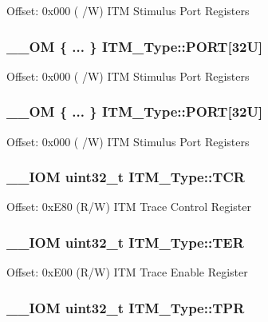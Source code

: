 Offset\-: 0x000 ( /\-W) I\-T\-M Stimulus Port Registers \hypertarget{struct_i_t_m___type_a2de1bb72a92abfeb659ae7d4c5f06420}{
\subsubsection[{P\-O\-R\-T}]{\setlength{\rightskip}{0pt plus 5cm}\-\_\-\-\_\-\-O\-M \{ ... \}    I\-T\-M\-\_\-\-Type\-::\-P\-O\-R\-T\mbox{[}32\-U\mbox{]}}}\label{struct_i_t_m___type_a2de1bb72a92abfeb659ae7d4c5f06420}
Offset\-: 0x000 ( /\-W) I\-T\-M Stimulus Port Registers \hypertarget{struct_i_t_m___type_a4fb98d5d5771d3b2f37c9a483b5793cc}{
\subsubsection[{P\-O\-R\-T}]{\setlength{\rightskip}{0pt plus 5cm}\-\_\-\-\_\-\-O\-M \{ ... \}    I\-T\-M\-\_\-\-Type\-::\-P\-O\-R\-T\mbox{[}32\-U\mbox{]}}}\label{struct_i_t_m___type_a4fb98d5d5771d3b2f37c9a483b5793cc}
Offset\-: 0x000 ( /\-W) I\-T\-M Stimulus Port Registers \hypertarget{struct_i_t_m___type_a04b9fbc83759cb818dfa161d39628426}{
\subsubsection[{T\-C\-R}]{\setlength{\rightskip}{0pt plus 5cm}\-\_\-\-\_\-\-I\-O\-M uint32\-\_\-t I\-T\-M\-\_\-\-Type\-::\-T\-C\-R}}\label{struct_i_t_m___type_a04b9fbc83759cb818dfa161d39628426}
Offset\-: 0x\-E80 (R/\-W) I\-T\-M Trace Control Register \hypertarget{struct_i_t_m___type_acd03c6858f7b678dab6a6121462e7807}{
\subsubsection[{T\-E\-R}]{\setlength{\rightskip}{0pt plus 5cm}\-\_\-\-\_\-\-I\-O\-M uint32\-\_\-t I\-T\-M\-\_\-\-Type\-::\-T\-E\-R}}\label{struct_i_t_m___type_acd03c6858f7b678dab6a6121462e7807}
Offset\-: 0x\-E00 (R/\-W) I\-T\-M Trace Enable Register \hypertarget{struct_i_t_m___type_ae907229ba50538bf370fbdfd54c099a2}{
\subsubsection[{T\-P\-R}]{\setlength{\rightskip}{0pt plus 5cm}\-\_\-\-\_\-\-I\-O\-M uint32\-\_\-t I\-T\-M\-\_\-\-Type\-::\-T\-P\-R}}\label{struct_i_t_m___type_ae907229ba50538bf370fbdfd54c099a2}
